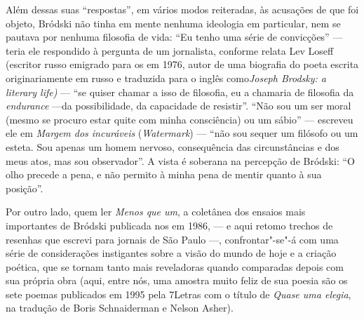 {Além dessas suas ``respostas'', em vários modos reiteradas, às
acusações de que foi objeto, Bródski não tinha em mente nenhuma
ideologia em particular, nem se pautava por nenhuma filosofia de vida:
``Eu tenho uma série de convicções'' --- teria ele respondido à
pergunta de um jornalista, conforme relata Lev Loseff (escritor russo emigrado
para os  em 1976, autor de uma biografia do poeta escrita
originariamente em russo e traduzida para o inglês como\emph{Joseph
Brodsky: a literary life)} --- ``se quiser
chamar a isso de filosofia, eu a chamaria de filosofia da
\emph{endurance} ---da possibilidade, da capacidade de resistir''.
``Não sou um ser moral (mesmo se procuro estar quite com minha
consciência) ou um sábio'' --- escreveu ele em \emph{Margem dos
incuráveis} (\emph{Watermark}) --- ``não sou sequer um filósofo ou um
esteta. Sou apenas um homem nervoso, consequência das circunstâncias e
dos meus atos, mas sou observador''. A vista é soberana na percepção de
Bródski: ``O olho precede a pena, e não permito à minha pena de mentir
quanto à sua posição''.

Por outro lado, quem ler \emph{Menos que um}, a coletânea dos ensaios
mais importantes de Bródski publicada nos  em 1986, --- e aqui
retomo trechos de resenhas que escrevi para jornais de São Paulo ---,
confrontar"-se"-á com uma série de considerações instigantes sobre a visão
do mundo de hoje e a criação poética, que se tornam tanto mais
reveladoras quando comparadas depois com sua própria obra (aqui, entre
nós, uma amostra muito feliz de sua poesia são os sete poemas publicados
em 1995 pela 7Letras com o título de \emph{Quase uma elegia}, na
tradução de Boris Schnaiderman e Nelson Asher).

}
